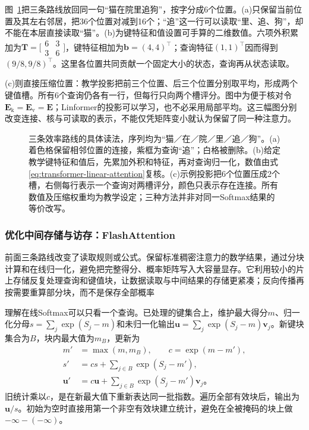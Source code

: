 图~\ref{fig:transformer-efficient-attention}把三条路线放回同一句“猫在院里追狗”，按字分成6个位置。(a)只保留当前位置及其左右邻居，把36个位置对减到16个；“追”这一行可以读取“里、追、狗”，却不能在本层直接读取“猫”。(b)为键特征和值设置可手算的二维数值。六项外积累加为$\bm T=\bigl[\begin{smallmatrix}6&3\\3&6\end{smallmatrix}\bigr]$，键特征相加为$\bm b=(4,4)^{\top}$；查询特征$(1,1)^{\top}$因而得到$(9/8,9/8)^{\top}$。这里各位置共同贡献一个固定大小的状态，查询再从状态读取。

(c)则直接压缩位置：教学投影把前三个位置、后三个位置分别取平均，形成两个键值槽。所有6个查询仍各有一行，但每行只向两个槽评分。图中为便于核对令$\bm E_{\mathrm k}=\bm E_{\mathrm v}=\bm E$；Linformer的投影可以学习，也不必采用局部平均。这三幅图分别改变连接、核与可读取的表示，不能仅凭矩阵变小就认为保留了同一种注意力。

\begin{figure}[p]
  \centering
  
  \caption{三条效率路线的具体读法，序列均为“猫／在／院／里／追／狗”。(a)着色格保留相邻位置的连接，紫框为查询“追”；白格被删除。(b)给定教学键特征和值后，先累加外积和特征，再对查询归一化，数值由式\eqref{eq:transformer-linear-attention}复核。(c)示例投影把6个位置压成2个槽，右侧每行表示一个查询对两槽评分，颜色只表示存在连接。所有数值及压缩权重均为教学设定；三种方法并非对同一Softmax结果的等价改写。}
  \label{fig:transformer-efficient-attention}
\end{figure}
\FloatBarrier

\subsubsection{优化中间存储与访存：FlashAttention}

前面三条路线改变了读取规则或公式。保留标准稠密注意力的数学结果，通过分块计算和在线归一化，避免把完整得分、概率矩阵写入大容量显存。它利用较小的片上存储反复处理查询和键值块，让数据读取与中间结果的存储更紧凑；反向传播再按需要重算部分块，而不是保存全部概率

理解在线Softmax可以只看一个查询。已处理的键集合上，维护最大得分$m$、归一化分母$s=\sum_j\exp(S_j-m)$和未归一化输出$\bm u=\sum_j\exp(S_j-m)\bm v_j$。新键块集合为$B$，块内最大值为$m_B$，更新为
\begin{equation}
  \begin{aligned}
    m'&=\max(m,m_B),\qquad c=\exp(m-m'),\\
    s'&=cs+\sum_{j\in B}\exp(S_j-m'),\\
    \bm u'&=c\bm u+\sum_{j\in B}\exp(S_j-m')\bm v_j\text{。}
  \end{aligned}
  \label{eq:transformer-online-softmax}
\end{equation}
旧统计乘以$c$，是在新最大值下重新表达同一批指数。遍历全部有效块后，输出为$\bm u/s$。初始为空时直接用第一个非空有效块建立统计，避免在全被掩码的块上做$-\infty-(-\infty)$。

